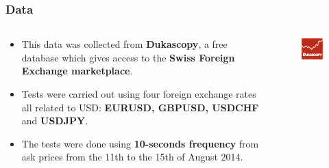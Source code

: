 \documentclass{beamer}
\begin{document}
\begin{frame}
\frametitle{Data}
\begin{columns}
\begin{column}{0.7\textwidth}
\begin{itemize}
\item This data was collected from {\bf Dukascopy}, a free
database which gives access to the {\bf Swiss Foreign Exchange marketplace}.
\item Tests were carried out using four foreign exchange rates all related to
USD: {\bf EURUSD, GBPUSD, USDCHF} and {\bf USDJPY}. 
\item The tests were done using {\bf 10-seconds frequency} from ask prices
from the 11th to the 15th of August 2014. 
\end{itemize}
\end{column}
\begin{column}{0.3\textwidth}
 \begin{figure}[!h]
    \includegraphics[width=\textwidth]{img/dukascopy}
 \end{figure}
\end{column}
\end{columns}
\end{frame}
\end{document}
